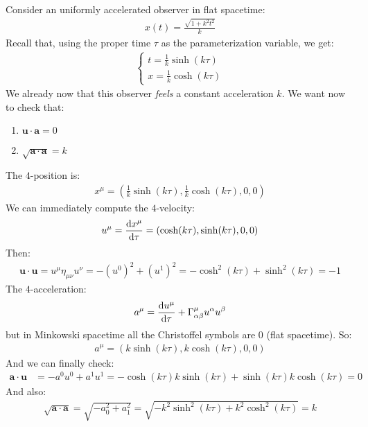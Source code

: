 \documentclass[../template.tex]{subfiles}
\begin{document}
\begin{example}
    Consider an uniformly accelerated observer in flat spacetime:
    \begin{align*}
        x(t) = \frac{\sqrt{1+k^2 t^2}}{k} 
    \end{align*}
    Recall that, using the proper time $\tau$ as the parameterization variable, we get:
    \begin{align*}
        \begin{cases}
            t = \frac{1}{k} \sinh(k \tau)\\
            x = \frac{1}{k} \cosh (k \tau)  
        \end{cases} 
    \end{align*}
    We already now that this observer \textit{feels} a constant acceleration $k$. We want now to check that:
    \begin{enumerate}
        \item $\bm{u} \cdot \bm{a} = 0$
        \item $\sqrt{\bm{a} \cdot \bm{a}} = k$  
    \end{enumerate}  
    The $4$-position is:
    \begin{align*}
        x^\mu = \left(\frac{1}{k} \sinh(k \tau), \frac{1}{k}\cosh(k \tau), 0,0  \right)
    \end{align*} 
    We can immediately compute the $4$-velocity:
    \begin{align*}
        u^\mu = \dv{x^\mu}{\tau} = \left(\cosh(k \tau), \sinh(k \tau), 0,0\right)
    \end{align*}
    Then:
    \begin{align*}
        \bm{u} \cdot \bm{u} = u^\mu \eta_{\mu \nu} u^\nu = -(u^0)^2 + (u^1)^2 = -\cosh^2 (k \tau) + \sinh^2 (k \tau) = -1
    \end{align*} 
    The $4$-acceleration:
    \begin{align*}
        a^\mu = \dv{u^\mu}{\tau} + \Gamma^\mu_{\alpha \beta} u^\alpha u^\beta
    \end{align*} 
    but in Minkowski spacetime all the Christoffel symbols are $0$ (flat spacetime). So:
    \begin{align*}
        a^\mu = \left(k \sinh(k \tau), k\cosh(k \tau), 0,0\right)
    \end{align*} 
    And we can finally check:
    \begin{align*}
        \bm{a} \cdot \bm{u} &= -a^0 u^0 + a^1 u^1 = -\cosh (k \tau) k \sinh(k \tau) + \sinh(k \tau) k\cosh(k \tau) = 0
    \end{align*}
    And also:
    \begin{align*}
        \sqrt{\bm{a} \cdot \bm{a}} = \sqrt{-a_0^2 + a_1^2} = \sqrt{-k^2 \sinh^2(k \tau) + k^2 \cosh^2 (k \tau)} = k
    \end{align*}
\end{example}
\end{document}
